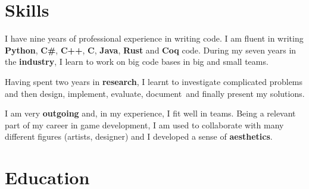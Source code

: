 \documentclass[letterpaper]{twentysecondcv} %
\begin{document}

\makeprofile %


\section{Skills}

I have nine years of professional experience in writing code. I am fluent in writing \textbf{Python}, \textbf{C\#}, \textbf{C++}, \textbf{C}, \textbf{Java}, \textbf{Rust} and \textbf{Coq} code. During my seven years in the \textbf{industry}, I learn to work on big code bases in big and small teams. 

Having spent two years in \textbf{research}, I learnt to investigate complicated problems and then design, implement, evaluate, document and finally present my solutions.

I am very \textbf{outgoing} and, in my experience, I fit well in teams. Being a relevant part of my career in game development, I am used to collaborate with many different figures (artists, designer) and I developed a sense of \textbf{aesthetics}.





\section{Education}

\begin{twenty} %
\end{twenty}
\end{document}
